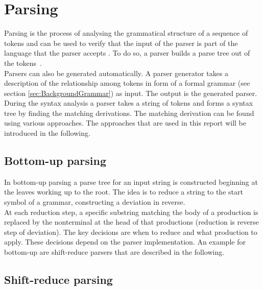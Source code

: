 \section{Parsing}\label{sec:BackgroundParser}

Parsing is the process of analysing the grammatical structure of a sequence of tokens and can be used to verify that the input of the parser is part of the language that the parser accepts \cite{Aho.2007}.
To do so, a parser builds a parse tree out of the tokens~\cite{Mogensen.2017}.\\
Parsers can also be generated automatically.
A parser generator takes a description of the relationship among tokens in form of a formal grammar (see section \ref{sec:BackgroundGrammar}) as input. The output is the generated parser. \cite{LexYacc.1992}\\
During the syntax analysis a parser takes a string of tokens and forms a syntax tree by finding the matching derivations. The matching derivation can be found using various approaches. The approaches that are used in this report will be introduced in the following.

\subsection{Bottom-up parsing}\label{sec:BackgroundParserBottomUp}

In bottom-up parsing a parse tree for an input string is constructed beginning at the leaves working up to the root. The idea is to reduce a string to the start symbol of a grammar, constructing a deviation in reverse.
\cite{Aho.2007}\\
At each reduction step, a specific substring matching the body of a production is replaced by the nonterminal at the head of that productions (reduction is reverse step of deviation).
The key decisions are when to reduce and what production to apply.
These decisions depend on the parser implementation.
An example for bottom-up are shift-reduce parsers that are described in the following.
\cite{Aho.2007}
\subsection{Shift-reduce parsing}\label{sec:BackgroundParserShiftReduce}

